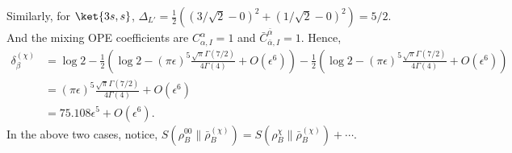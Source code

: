 \documentclass[11pt]{article}
\newcommand{\ep}{\epsilon}
\newcommand{\lb}{\left(}
\newcommand{\rb}{\right)}
\begin{document}
Similarly, for $\ket{3s,s}$,
$\Delta_{L'} = \frac{1}{2}\lb\left(3/\sqrt{2}-0\right)^2
+ \left(1/\sqrt{2}-0\right)^2\rb = 5/2$.
And the mixing OPE coefficients are
$C_{\alpha,I}^{\alpha}=1$ and
$\bar{C}_{\bar{\alpha},I}^{\bar{\alpha}}=1$.
Hence,
\begin{align}
    \delta_\beta^{(\chi)}  &= \log 2 - \frac{1}{2}\lb \log 2 - (\pi \ep)^{5}\frac{\sqrt{\pi}\Gamma(7/2)}{4\Gamma(4)} + O(\ep^6)\rb - \frac{1}{2}\lb  \log 2 - (\pi \ep)^{5}\frac{\sqrt{\pi}\Gamma(7/2)}{4\Gamma(4)}+ O(\ep^6)\rb  \\
    &=(\pi \ep)^{5}\frac{\sqrt{\pi}\Gamma(7/2)}{4\Gamma(4)}+ O(\ep^6) \\
    &= 75.108 \ep^{5} + O(\ep^6).
\end{align}
In the above two cases, notice, $S(\rho_B^{00} \| \bar \rho^{(\chi)}_B  ) = S(\rho^\chi_B \| \bar \rho ^{(\chi)}_B) + \cdots$. 
\end{document}
